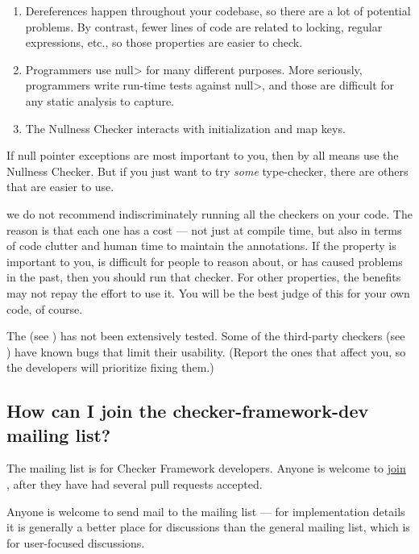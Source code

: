 \begin{enumerate}
\item
  Dereferences happen throughout your codebase, so there are a lot of
  potential problems.  By contrast, fewer lines of code are related to
  locking, regular expressions, etc., so those properties are easier to
  check.
\item
  Programmers use \<null> for many different purposes.  More seriously,
  programmers write run-time tests against \<null>, and those are difficult
  for any static analysis to capture.
\item
  The Nullness Checker interacts with initialization and map keys.
\end{enumerate}

If null pointer exceptions are most important to you, then by all means use
the Nullness Checker.  But if you just want to try \emph{some}
type-checker, there are others that are easier to use.

we do not recommend indiscriminately running all the checkers on your code.
The reason is that each one has a cost --- not just at compile time, but
also in terms of code clutter and human time to maintain the annotations.
If the property is important to you, is difficult for people to reason
about, or has caused problems in the past, then you should run that
checker.  For other properties, the benefits may not repay the effort to
use it.  You will be the best judge of this for your own code, of course.

The  (see
) has not been extensively tested.
Some of the third-party checkers (see
)
have known bugs that limit their
usability.  (Report the ones that affect you, so the developers
will prioritize fixing them.)


\subsection{How can I join the checker-framework-dev mailing list?\label{faq-checker-framework-dev}}

The  mailing list is for
Checker Framework developers.  Anyone is welcome to
\href{https://groups.google.com/forum/#!forum/checker-framework-dev}{join
  }, after they have had several pull requests
accepted.

Anyone is welcome to send mail to the
 mailing list --- for
implementation details it is generally a better place for discussions than
the general  mailing list,
which is for user-focused discussions.

